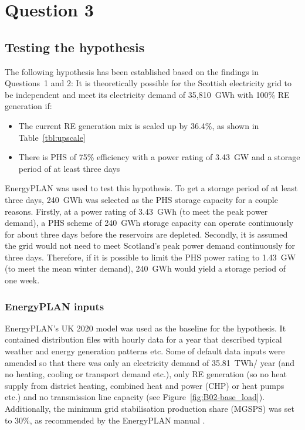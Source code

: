 \section{Question 3}



\subsection{Testing the hypothesis}

The following hypothesis has been established based on the findings in Questions~1 and 2:
It is theoretically possible for the Scottish electricity grid to be independent and meet its electricity demand of 35,810~GWh with 100\% RE generation if:
\begin{itemize}
	\item The current RE generation mix is scaled up by 36.4\%, as shown in Table~\ref{tbl:upscale}
	\item There is PHS of 75\% efficiency with a power rating of 3.43~GW and a storage period of at least three days
\end{itemize}

EnergyPLAN was used to test this hypothesis.
To get a storage period of at least three days, 240~GWh was selected as the PHS storage capacity for a couple reasons.
Firstly, at a power rating of 3.43~GWh (to meet the peak power demand), a PHS scheme of 240~GWh storage capacity can operate continuously for about three days before the reservoirs are depleted.
Secondly, it is assumed the grid would not need to meet Scotland's peak power demand continuously for three days.
Therefore, if it is possible to limit the PHS power rating to 1.43~GW (to meet the mean winter demand), 240~GWh would yield a storage period of one week.



\subsubsection{EnergyPLAN inputs}

EnergyPLAN's UK 2020 model \citep{EnergyPLAN_UK2020} was used as the baseline for the hypothesis.
It contained distribution files with hourly data for a year that described typical weather and energy generation patterns etc.
Some of default data inputs were amended so that there was only an electricity demand of 35.81~TWh/ year (and no heating, cooling or transport demand etc.), only RE generation (so no heat supply from district heating, combined heat and power (CHP) or heat pumps etc.) and no transmission line capacity (see Figure~\ref{fig:B02-base_load}).
Additionally, the minimum grid stabilisation production share (MGSPS) was set to 30\%, as recommended by the EnergyPLAN manual \citep{Lund2017}.

